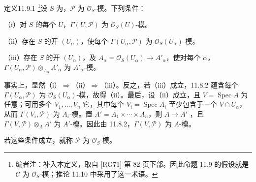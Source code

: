 \begin{SGAresult}{定义}{11.9.1}
\footnote{编者注：补入本定义，取自 [RG71] 第 82 页下部。因此命题 11.9 的假设就是 $\mathcal C$ 为 $\mathcal O_S$-模；推论 11.10 中采用了这一术语。}设 $S$ 为，$\mathcal P$ 为 $\mathcal O_S$-模。下列条件：

（i）对 $S$ 的每个 $U$，$\Gamma(U,\mathcal P)$ 为 $\mathcal O_S(U)$-模。

（ii）存在 $S$ 的开 $(U_\alpha)$，使每个 $\Gamma(U_\alpha,\mathcal P)$ 为 $\mathcal O_S(U_\alpha)$-模。

（iii）存在 $S$ 的开 $(U_\alpha)$，及 $A_\alpha=\mathcal O_S(U_\alpha)\to A'_\alpha$，使对每个 $\alpha$，$\Gamma(U_\alpha,\mathcal P)\otimes_{A_\alpha}A'_\alpha$ 为 $A'_\alpha$-模。
\end{SGAresult}
事实上，显然（i）$\Rightarrow$（ii）$\Rightarrow$（iii）。反之，若（iii）成立，11.8.2 蕴含每个 $\Gamma(U_\alpha,\mathcal P)$ 为 $\mathcal O_S(U_\alpha)$-模，故得（ii）。最后，设（ii）成立，且 $V=\operatorname{Spec}A$ 为任意；可用多个 $V_1,\ldots,V_n$ 它，其中每个 $V_i=\operatorname{Spec}A_i$ 至少包含于一个 $V\cap U_\alpha$，从而 $\Gamma(V_i,\mathcal P)$ 为 $A_i$-模。置 $A'=A_1\times\cdots\times A_n$，则 $A\to A'$ ，且 $\Gamma(V,\mathcal P)\otimes_A A'$ 为 $A'$-模。因此由 11.8.2，$\Gamma(V,\mathcal P)$ 为 $A$-模。

若这些条件成立，就称 $\mathcal P$ 为 $\mathcal O_S$-模。

